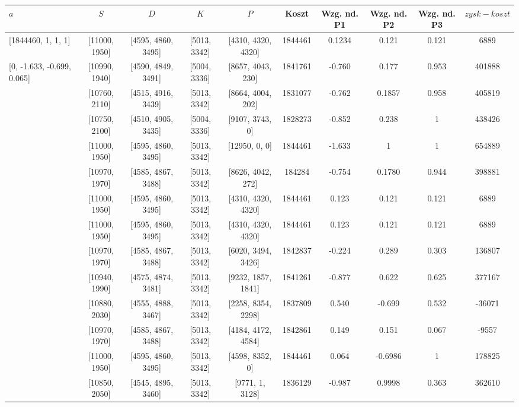 \documentclass[a4paper, 10pt]{article}
\begin{document}
\begin{landscape}
\begin{center}
\begin{tabular}{ | l | c | c | c | c | c | c | c | c |c |}
    $a$ & $S$ & $D$ & $K$ & $P$ & Koszt & Wzg. nd. P1  & Wzg. nd. P2 & Wzg. nd. P3 & $zysk-koszt$ \\ \hline	 
	 \textcolor{red!70}{[1844460, 1, 1, 1]} &  [11000, 1950] & [4595, 4860, 3495] & [5013, 3342] & [4310, 4320, 4320] & 1844461 & 0.1234  & 0.121  & 0.121  & 6889 \\  \hline
	 \textcolor{green!80}{[0, -1.633, -0.699, 0.065]} &  [10990, 1940] & [4590, 4849, 3491] & [5004, 3336] & [8657, 4043, 230] & 1841761 & -0.760  & 0.177  & 0.953  & 401888 \\  \hline
	 [1800000, -1.633, -0.699, 0.065] &  [10760, 2110] & [4515, 4916, 3439] & [5013, 3342] & [8664, 4004, 202] & 1831077 & -0.762  & 0.1857  & 0.958  & 405819 \\  \hline
	 [1800000, -2, -0.699, 0.065] &  [10750, 2100] & [4510, 4905, 3435] & [5004, 3336] & [9107, 3743, 0] & \textcolor{blue!80}{1828273} & -0.852  & 0.238  & 1  & 438426 \\  \hline
	 [1800000, -3, -0.699, 0.065] &  [11000, 1950] & [4595, 4860, 3495] & [5013, 3342] & [12950, 0, 0] & 1844461 & \textcolor{blue!80}{ -1.633}  & 1  & 1  & \textcolor{blue!80}{654889} \\  \hline
	 [1500000, -1.633, -0.699, 0.065] &  [10970, 1970] & [4585, 4867, 3488] & [5013, 3342] & [8626, 4042, 272] & 184284 & -0.754  & 0.1780  & 0.944  & 398881 \\  \hline
	 [1500000, -1, -1, -1] &  [11000, 1950] & [4595, 4860, 3495] & [5013, 3342] & [4310, 4320, 4320] & 1844461 & 0.123  & 0.121  & 0.121  & 6889\\ \hline
	 [1800000, 0, 0, 0] &  [11000, 1950] & [4595, 4860, 3495] & [5013, 3342] & [4310, 4320, 4320] & 1844461 & 0.123  & 0.121  & 0.121  & 6889 \\ \hline
	 [1800000, 0, 0.5, 0.5] &  [10970, 1970] & [4585, 4867, 3488] & [5013, 3342] & [6020, 3494, 3426] & 1842837 & -0.224  & 0.289  & 0.303  & 136807 \\ \hline
	 [1000000, -1, 0.5, 0.5] &  [10940, 1990] & [4575, 4874, 3481] & [5013, 3342] & [9232, 1857, 1841] & 1841261 & -0.877  & 0.622  & 0.625  & 377167 \\ \hline
	 [1000000, 0.5, -1, 0.5] &  [10880, 2030] & [4555, 4888, 3467] & [5013, 3342] & [2258, 8354, 2298] & 1837809 & 0.540  & \textcolor{blue!80}{ -0.699}  & 0.532  & -36071 \\ \hline
	 [1000000, 0.5, 0.5, -1] &  [10970, 1970] & [4585, 4867, 3488] & [5013, 3342] & [4184, 4172, 4584] & 1842861 & 0.149  & 0.151  & \textcolor{blue!80}{0.067}  & -9557\\ \hline
	 [1000000, -1, -1, 1] &  [11000, 1950] & [4595, 4860, 3495] & [5013, 3342] & [4598, 8352, 0] & 1844461 & 0.064  & -0.6986  & 1  & 178825 \\ \hline
	 [1000000, -2, 0, -1] &  [10850, 2050] & [4545, 4895, 3460] & [5013, 3342] & [9771, 1, 3128] & 1836129 & -0.987  & 0.9998  & 0.363 & 362610 \\ \hline
	 

\end{tabular}
\end{center}
\end{landscape}
\end{document}
